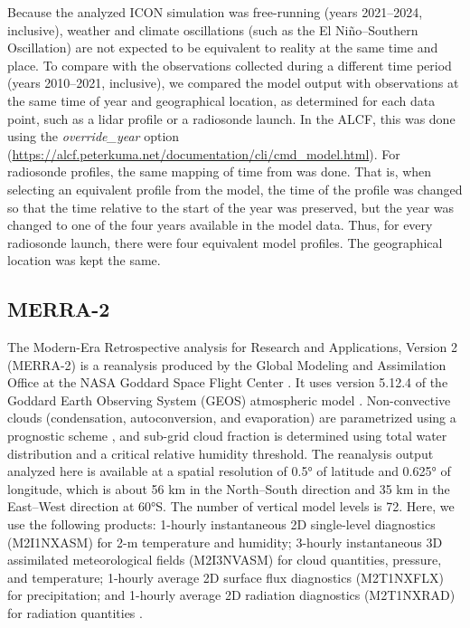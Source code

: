 \documentclass[draft]{agujournal2019}
\begin{document}
Because the analyzed ICON simulation was free-running (years 2021--2024, inclusive), weather and climate oscillations (such as the El Niño--Southern Oscillation) are not expected to be equivalent to reality at the same time and place. To compare with the observations collected during a different time period (years 2010--2021, inclusive), we compared the model output with observations at the same time of year and geographical location, as determined for each data point, such as a lidar profile or a radiosonde launch. In the ALCF, this was done using the \emph{override\_year} option (\url{https://alcf.peterkuma.net/documentation/cli/cmd_model.html}). For radiosonde profiles, the same mapping of time from was done. That is, when selecting an equivalent profile from the model, the time of the profile was changed so that the time relative to the start of the year was preserved, but the year was changed to one of the four years available in the model data. Thus, for every radiosonde launch, there were four equivalent model profiles. The geographical location was kept the same.

\subsection{MERRA-2}

The Modern-Era Retrospective analysis for Research and Applications, Version 2 (MERRA-2) is a reanalysis produced by the Global Modeling and Assimilation Office at the NASA Goddard Space Flight Center \cite{gelaro2017}. It uses version 5.12.4 of the Goddard Earth Observing System (GEOS) atmospheric model \cite{rienecker2008,molod2015}. Non-convective clouds (condensation, autoconversion, and evaporation) are parametrized using a prognostic scheme \cite{bacmeister2006}, and sub-grid cloud fraction is determined using total water distribution and a critical relative humidity threshold. The reanalysis output analyzed here is available at a spatial resolution of 0.5° of latitude and 0.625° of longitude, which is about 56 km in the North--South direction and 35 km in the East--West direction at 60°S. The number of vertical model levels is 72. Here, we use the following products: 1-hourly instantaneous 2D single-level diagnostics (M2I1NXASM) for 2-m temperature and humidity; 3-hourly instantaneous 3D assimilated meteorological fields (M2I3NVASM) for cloud quantities, pressure, and temperature; 1-hourly average 2D surface flux diagnostics (M2T1NXFLX) for precipitation; and 1-hourly average 2D radiation diagnostics (M2T1NXRAD) for radiation quantities \cite{merra2}.
\end{document}
